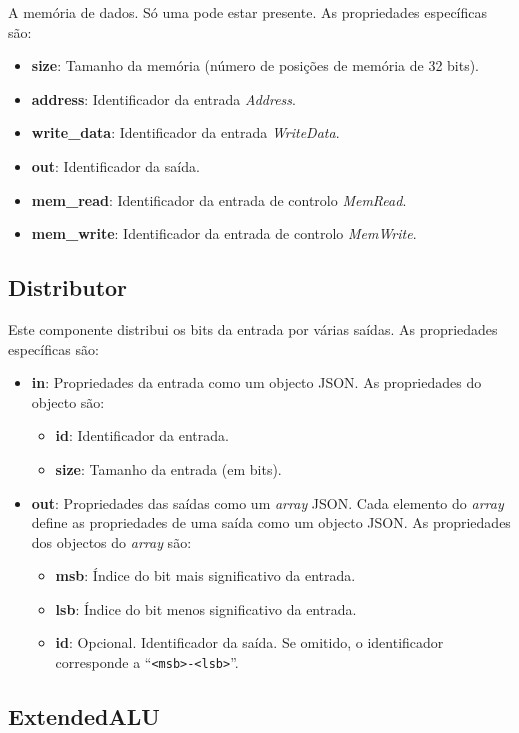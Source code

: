 \documentclass[11pt,a4paper,twoside,titlepage]{report}
\begin{document}
A memória de dados. Só uma pode estar presente. As propriedades específicas são:
\begin{itemize}
	\item \textbf{size}: Tamanho da memória (número de posições de memória de
		32 bits).
	\item \textbf{address}: Identificador da entrada \emph{Address}.
	\item \textbf{write\_data}: Identificador da entrada \emph{WriteData}.
	\item \textbf{out}: Identificador da saída.
	\item \textbf{mem\_read}: Identificador da entrada de controlo \emph{MemRead}.
	\item \textbf{mem\_write}: Identificador da entrada de controlo \emph{MemWrite}.
\end{itemize}

\subsection{Distributor}

Este componente distribui os bits da entrada por várias saídas.
As propriedades específicas são:
\begin{itemize}
	\item \textbf{in}: Propriedades da entrada como um objecto JSON.
		As propriedades do objecto são:
		\begin{itemize}
			\item \textbf{id}: Identificador da entrada.
			\item \textbf{size}: Tamanho da entrada (em bits).
		\end{itemize}
	\item \textbf{out}: Propriedades das saídas como um \emph{array} JSON.
		Cada elemento do \emph{array} define as propriedades de uma saída como um
		objecto JSON. As propriedades dos objectos do \emph{array} são:
		\begin{itemize}
			\item \textbf{msb}: Índice do bit mais significativo da entrada.
			\item \textbf{lsb}: Índice do bit menos significativo da entrada.
			\item \textbf{id}: Opcional. Identificador da saída. Se omitido, o
				identificador corresponde a ``\verb+<msb>-<lsb>+''.
		\end{itemize}
\end{itemize}

\subsection{ExtendedALU}
\end{document}

